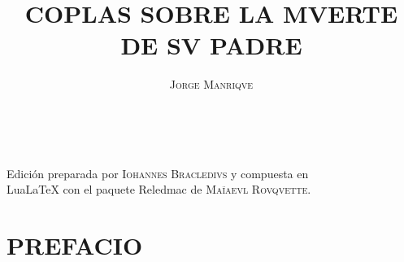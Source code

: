 \documentclass[11pt,a4paper,twoside]{article}
\title{COPLAS SOBRE LA MVERTE DE SV PADRE}
\author{\fontsize{14}{11.96}\selectfont \textsc{Jorge Manriqve}}
\date{\vspace{60pt}\fontsize{12}{11}\selectfont{\textsc{Edición crítica liminar}}\\\fontsize{40}{11}\selectfont{\vfill\LaTeX}}
\begin{document}
	{
	\maketitle
}
	\newpage
%
\hskip0pt
\vfill
\begin{flushright}
	Edición preparada por \textsc{Iohannes Bracledivs} y compuesta en\\ LuaLaTeX con el paquete Reledmac de \textsc{Maïaevl Rovqvette}.
\end{flushright}
\newpage
%
\tableofcontents
\newpage
%
\setcounter{page}{1}
\section*{\centering\fontsize{11}{14}\selectfont PREFACIO}
\end{document}
